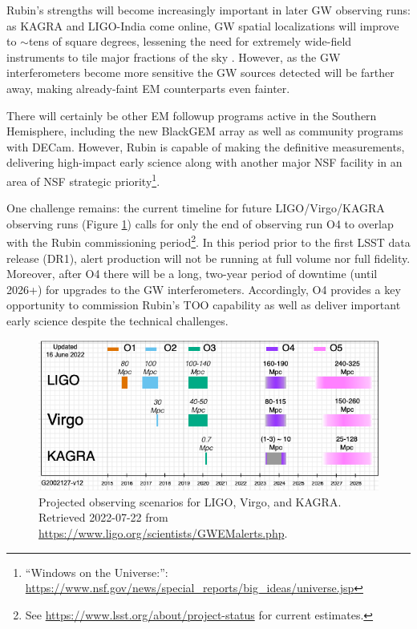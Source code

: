 \documentclass[DM,authoryear,toc]{lsstdoc}
\begin{document}
Rubin's strengths will become increasingly important in later GW observing runs: 
as KAGRA and LIGO-India come online, GW spatial localizations will improve to $\sim$tens of square degrees, lessening the need for extremely wide-field instruments to tile major fractions of the sky \citep{2022ApJ...924...54P}.  
However, as the GW interferometers become more sensitive the GW sources detected will be farther away, making already-faint EM counterparts even fainter.

There will certainly be other EM followup programs active in the Southern Hemisphere, including the new BlackGEM array as well as community programs with DECam.
However, Rubin is capable of making the definitive measurements, delivering high-impact early science along with another major NSF facility in an area of NSF strategic priority\footnote{``Windows on the Universe:'': \url{https://www.nsf.gov/news/special_reports/big_ideas/universe.jsp}}.

One challenge remains: the current timeline for future LIGO/Virgo/KAGRA observing runs (Figure \ref{fig:scenarios}) calls for only the end of observing run O4 to overlap with the Rubin commissioning period\footnote{See \url{https://www.lsst.org/about/project-status} for current estimates.}.
In this period prior to the first LSST data release (DR1), alert production will not be running at full volume nor full fidelity.
Moreover, after O4 there will be a long, two-year period of downtime (until 2026+) for upgrades to the GW interferometers.  
Accordingly, O4 provides a key opportunity to commission Rubin's TOO capability as well as deliver important early science despite the technical challenges.

\begin{figure}
\includegraphics[width=\textwidth]{figures/LVK_run_plan_220615.png}
\caption{Projected observing scenarios for LIGO, Virgo, and KAGRA.  Retrieved 2022-07-22 from 
\url{https://www.ligo.org/scientists/GWEMalerts.php}.
	\label{fig:scenarios}}
\end{figure}
\end{document}
